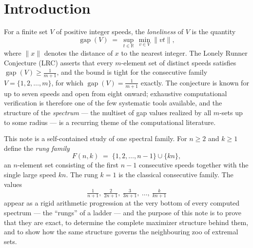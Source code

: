 \documentclass[11pt,a4paper]{article}
\theoremstyle{plain}
\theoremstyle{definition}
\theoremstyle{remark}
\newcommand{\norm}[1]{\lVert #1 \rVert}
\newcommand{\gap}{\operatorname{gap}}
\newcommand{\R}{\mathbb{R}}
\begin{document}
\tableofcontents
\newpage

\section{Introduction}\label{sec:intro}

For a finite set $V$ of positive integer speeds, the \emph{loneliness} of $V$
is the quantity
\[
  \gap(V) \;=\; \sup_{t \in \R}\, \min_{v \in V} \norm{v t},
\]
where $\norm{x}$ denotes the distance of $x$ to the nearest integer. The
Lonely Runner Conjecture (LRC) asserts that every $m$-element set of distinct
speeds satisfies $\gap(V) \ge \tfrac{1}{m+1}$, and the bound is tight for the
consecutive family $V = \{1, 2, \dots, m\}$, for which
$\gap(V) = \tfrac{1}{m+1}$ exactly. The conjecture is known for up to seven
speeds and open from eight onward; exhaustive computational verification is
therefore one of the few systematic tools available, and the structure of the
\emph{spectrum} --- the multiset of gap values realized by all $m$-sets up to
some radius --- is a recurring theme of the computational literature.

This note is a self-contained study of one spectral family. For $n \ge 2$ and
$k \ge 1$ define the \emph{rung family}
\[
  F(n,k) \;=\; \{1, 2, \dots, n-1\} \cup \{kn\},
\]
an $n$-element set consisting of the first $n-1$ consecutive speeds together
with the single large speed $kn$. The rung $k=1$ is the classical consecutive
family. The values
\[
  \tfrac{1}{n+1},\ \tfrac{2}{2n+1},\ \tfrac{3}{3n+1},\ \dots,\ \tfrac{k}{kn+1}
\]
appear as a rigid arithmetic progression at the very bottom of every computed
spectrum --- the ``rungs'' of a ladder --- and the purpose of this note is to
prove that they are exact, to determine the complete maximizer structure
behind them, and to show how the same structure governs the neighbouring zoo
of extremal sets.
\end{document}
